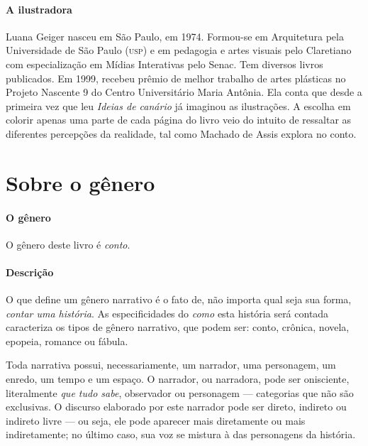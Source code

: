 \documentclass[11pt]{extarticle}
\begin{document}
\paragraph{A ilustradora} Luana Geiger nasceu em São Paulo, em 1974. Formou-se em Arquitetura pela Universidade de São Paulo (\textsc{usp}) e em pedagogia e artes visuais pelo Claretiano com especialização em Mídias Interativas pelo Senac. Tem diversos livros publicados. Em 1999, recebeu prêmio de melhor trabalho de artes plásticas no Projeto Nascente 9 do Centro Universitário Maria Antônia. Ela conta que desde a primeira vez que leu \textit{Ideias de canário} já imaginou as ilustrações. A escolha em colorir apenas uma parte de cada página do livro veio do intuito de ressaltar as diferentes percepções da realidade, tal como Machado de Assis explora no conto.



\section{Sobre o gênero}

\paragraph{O gênero} O gênero deste livro é \textit{conto}.

\paragraph{Descrição} O que define um gênero narrativo é o fato de, não importa qual seja sua forma, \textit{contar uma história}.
As especificidades do \textit{como} esta história será contada caracteriza os tipos de gênero narrativo, que podem ser: conto, crônica, novela, epopeia, romance ou fábula. 

Toda narrativa possui, necessariamente, um narrador, uma personagem, um enredo, um tempo e um espaço. O narrador, ou narradora, pode ser onisciente, literalmente \textit{que tudo sabe}, observador ou personagem --- categorias que não são exclusivas. O discurso elaborado por este narrador pode ser direto, indireto ou indireto livre --- ou seja, ele pode aparecer mais diretamente ou mais indiretamente; no último caso, sua voz se mistura à das personagens da história.
\end{document}
